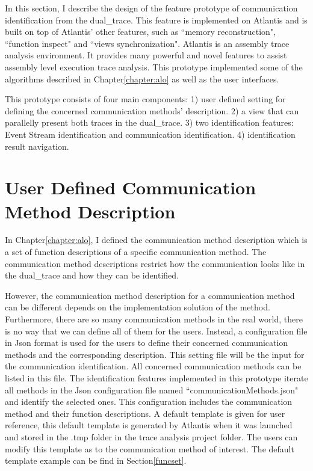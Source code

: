 

\label{chapter:newsol}
In this section, I describe the design of the feature prototype of communication identification from the dual\_trace. This feature is implemented on Atlantis and is built on top of Atlantis' other features, such as ``memory reconstruction", ``function inspect" and ``views synchronization". Atlantis is an assembly trace analysis environment. It provides many powerful and novel features to assist assembly level execution trace analysis.\cite{huang2017atlantis} This prototype implemented some of the algorithms described in Chapter\ref{chapter:alo} as well as the user interfaces.

This prototype consists of four main components: 1) user defined setting for defining the concerned communication methods' description. 2) a view that can parallelly present both traces in the dual\_trace. 3) two identification features: Event Stream identification and communication identification. 4) identification result navigation.


\section{User Defined Communication Method Description}\label{functionset}
In Chapter\ref{chapter:alo}, I defined the communication method description which is a set of function descriptions of a specific communication method. The communication method descriptions restrict how the communication looks like in the dual\_trace and how they can be identified.

However, the communication method description for a communication method can be different depends on the implementation solution of the method. Furthermore, there are so many communication methods in the real world, there is no way that we can define all of them for the users. Instead, a configuration file in Json format is used for the users to define their concerned communication methods and the corresponding description. This setting file will be the input for the communication identification. All concerned communication methods can be listed in this file. The identification features implemented in this prototype iterate all methods in the Json configuration file named ``communicationMethods.json" and identify the selected ones. This configuration includes the communication method and their function descriptions. A default template is given for user reference, this default template is generated by Atlantis when it was launched and stored in the .tmp folder in the trace analysis project folder. The users can modify this template as to the communication method of interest. The default template example can be find in Section\ref{funcset}.

